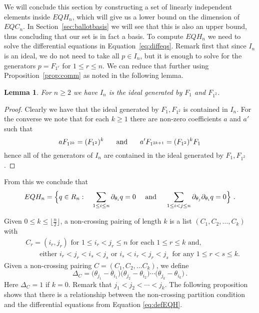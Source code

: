 \documentclass[submission]{FPSAC2023}
\newtheorem{lemma}[theorem]{Lemma}
\theoremstyle{definition}
\numberwithin{equation}{section}
\begin{document}
We will conclude this section  by constructing a set of linearly independent elements inside $EQH_n$, which will
give us a lower  bound on the dimension of $EQC_n$. In Section~\ref{sec:ballotbasis} we will see that this is also an upper bound,
thus concluding that our  set is in fact a basis. To compute $EQH_n$ we need to solve the differential equations in Equation~\eqref{eq:diffeqs}.
Remark first  that since $I_n$ is an ideal, we do not need to take all $p\in I_n$, but it is enough to solve for the generators $p=F_{1^r}$ for  $1\le r\le n$.
We can reduce that further using Proposition~\ref{prop:comm} as noted in the following lemma.
\begin{lemma}\label{lem:idealgen}
For $n\ge 2$ we have $I_n$ is the ideal generated by $F_1$ and $F_{1^2}$.
\end{lemma}

\begin{proof} Clearly we have that the ideal generated by $F_1, F_{1^2}$ is contained in $I_n$.
For the converse we note that for each $k\geq 1$
there are non-zero coefficients $a$ and $a'$ such that
\[
a F_{1^{2k}} = (F_{1^2})^k \hskip .2in\hbox{   and   }\hskip .2in a' F_{1^{2k+1}} = (F_{1^2})^k F_1
\]
hence all of the generators of $I_n$ are contained in the ideal generated by $F_1, F_{1^2}$.
\end{proof}
From this we conclude that
\begin{equation}\label{eq:defEQH}
EQH_n =  \Big\{ q \in R_n :  \quad\sum_{1\le i\le n} \partial_{\theta_i}q= 0 \quad\hbox{ and  }\quad \sum_{1\le i<j\le n} \partial_{\theta_j}\partial_{\theta_i}q= 0 \Big\}~.
\end{equation}

Given $0\le k\le \lfloor \frac{n}{2}\rfloor$, a non-crossing pairing of length $k$ is a
list $(C_1, C_2, \ldots, C_k)$ with
\begin{align*}
 &C_r=(i_r,j_r) \text{ for $1\le i_r<j_r\le n$ for each $1 \leq r \leq k$ and,}\\
 &\qquad \text{either } i_r<j_r<i_s<j_s  \text{ or }  i_s<i_r<j_r<j_s\,\text{ for any $1\le r<s\le k$}.
\end{align*}
Given a non-crossing pairing $C=(C_1,C_2,\ldots C_k)$, we define
\begin{equation}\label{eq:Deltadef}
\Delta_C = \big(\theta_{j_1}-\theta_{i_1}\big)\big(\theta_{j_2}-\theta_{i_2}\big)\cdots \big(\theta_{j_k}-\theta_{i_k}\big)\,.
\end{equation}
Here $\Delta_C=1$ if $k=0$. Remark that $j_1<j_2<\cdots< j_k$.
The following proposition shows that there is a relationship between the non-crossing
partition condition and the differential equations from Equation \eqref{eq:defEQH}.
\end{document}
